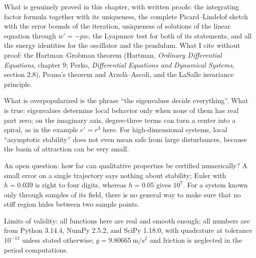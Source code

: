 \begin{untukpeneliti}
What is genuinely proved in this chapter, with written proofs: the integrating factor
formula together with its uniqueness, the complete Picard--Lindelof sketch with the error
bounds of the iteration, uniqueness of solutions of the linear equation through $w'=-pw$, the
Lyapunov test for both of its statements, and all the energy identities for the oscillator
and the pendulum. What I cite without proof: the Hartman--Grobman theorem (Hartman,
\emph{Ordinary Differential Equations}, chapter 9; Perko, \emph{Differential
Equations and Dynamical Systems}, section 2.8), Peano's theorem and
Arzel\`a--Ascoli, and the LaSalle invariance principle.

What is overpopularized is the phrase ``the eigenvalues decide everything''. What is true:
eigenvalues determine local behavior only when none of them has real part zero; on the
imaginary axis, degree-three terms can turn a center into a spiral, as in the example
$r'=r^{3}$ here. For high-dimensional systems, local ``asymptotic stability'' does not even
mean safe from large disturbances, because the basin of attraction can be very small.

An open question: how far can qualitative properties be certified numerically? A small error
on a single trajectory says nothing about stability; Euler with $h=0.039$ is right to four
digits, whereas $h=0.05$ gives $10^{7}$. For a system known only through samples of its
field, there is no general way to make sure that no stiff region hides between two sample
points.

Limits of validity: all functions here are real and smooth enough; all numbers are from
Python 3.14.4, NumPy 2.5.2, and SciPy 1.18.0, with quadrature at tolerance
$10^{-13}$ unless stated otherwise; $g=9.80665\ \mathrm{m/s^{2}}$ and friction is
neglected in the period computations.
\end{untukpeneliti}

